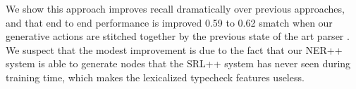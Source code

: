 \documentclass[11pt]{article}
\begin{document}
We show this approach improves recall dramatically over previous approaches, and that end to end performance is improved 0.59 to 0.62 smatch when our generative actions are stitched together by the previous state of the art parser \cite{Flanigan:14}.
We suspect that the modest improvement is due to the fact that our NER++ system is able to generate nodes that the SRL++ system has never seen during training time, which makes the lexicalized typecheck features useless.






\end{document}
